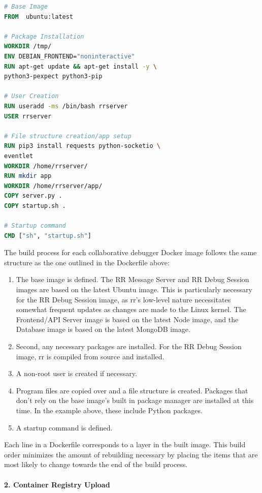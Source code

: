 \documentclass[12pt]{article}
\begin{document}
\begin{lstlisting}[language=Dockerfile,caption={RR Message Server Dockerfile},captionpos=b]
# Base Image
FROM  ubuntu:latest

# Package Installation
WORKDIR /tmp/
ENV DEBIAN_FRONTEND="noninteractive"
RUN apt-get update && apt-get install -y \
python3-pexpect python3-pip

# User Creation
RUN useradd -ms /bin/bash rrserver
USER rrserver

# File structure creation/app setup
RUN pip3 install requests python-socketio \
eventlet
WORKDIR /home/rrserver/
RUN mkdir app
WORKDIR /home/rrserver/app/
COPY server.py .
COPY startup.sh .

# Startup command
CMD ["sh", "startup.sh"]
\end{lstlisting}

The build process for each collaborative debugger Docker image follows
the same structure as the one outlined in the Dockerfile above:

\begin{enumerate}
\item The base image is defined. The RR Message Server and RR Debug
  Session images are based on the latest Ubuntu image.  This is
  particularly necessary for the RR Debug Session image, as rr's
  low-level nature necessitates somewhat frequent updates as changes
  are made to the Linux kernel.  The Frontend/API Server image is
  based on the latest Node image, and the Database image is based on
  the latest MongoDB image.
\item Second, any necessary packages are installed.  For the RR Debug
  Session image, rr is compiled from source and installed.
\item A non-root user is created if necessary.
\item Program files are copied over and a file structure is created.
  Packages that don't rely on the base image's built in package
  manager are installed at this time.  In the example above, these
  include Python packages.
\item A startup command is defined.
\end{enumerate}

Each line in a Dockerfile corresponds to a layer in the built image.
This build order minimizes the amount of rebuilding necessary by
placing the items that are most likely to change towards the end of
the build process.

\paragraph{2. Container Registry Upload}
\end{document}
